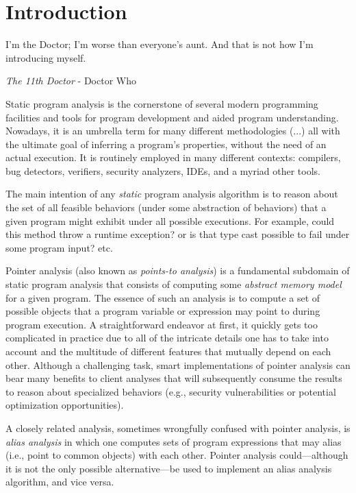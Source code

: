 \chapter{Introduction}\label{chapter:intro}

\epigraph{I'm the Doctor; I'm worse than everyone's aunt. And that is not how I'm introducing myself.}{\textit{The 11th Doctor} - Doctor Who}

Static program analysis is the cornerstone of several modern programming
facilities and tools for program development and aided program understanding.
Nowadays, it is an umbrella term for many different methodologies (...) all
with the ultimate goal of inferring a program's properties, without the need of
an actual execution. It is routinely employed in many different contexts:
compilers, bug detectors, verifiers, security analyzers, IDEs, and a myriad
other tools.

The main intention of any \emph{static} program analysis algorithm is to reason
about the set of all feasible behaviors (under some abstraction of behaviors)
that a given program might exhibit under all possible executions. For example,
could this method throw a runtime exception? or is that type cast possible to
fail under some program input? etc.

Pointer analysis (also known as \emph{points-to analysis}) is a fundamental
subdomain of static program analysis that consists of computing some
\emph{abstract memory model} for a given program. The essence of such an
analysis is to compute a set of possible objects that a program variable or
expression may point to during program execution. A straightforward endeavor at
first, it quickly gets too complicated in practice due to all of the intricate
details one has to take into account and the multitude of different features
that mutually depend on each other. Although a challenging task, smart
implementations of pointer analysis can bear many benefits to client analyses
that will subsequently consume the results to reason about specialized
behaviors (e.g., security vulnerabilities or potential optimization
opportunities).

A closely related analysis, sometimes wrongfully confused with pointer
analysis, is \emph{alias analysis} in which one computes sets of program
expressions that may alias (i.e., point to common objects) with each other.
Pointer analysis could---although it is not the only possible alternative---be
used to implement an alias analysis algorithm, and vice versa.

